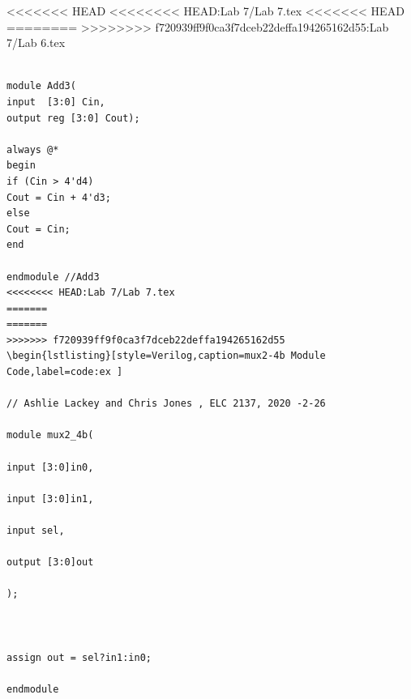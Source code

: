 \documentclass[11pt]{article}
\begin{document}
<<<<<<< HEAD
<<<<<<<< HEAD:Lab 7/Lab 7.tex
<<<<<<< HEAD
========
>>>>>>>> f720939ff9f0ca3f7dceb22deffa194265162d55:Lab 7/Lab 6.tex
\begin{lstlisting}[style=Verilog,caption=Add 3 Module Code,label=code:ex ]

module Add3(
input  [3:0] Cin,
output reg [3:0] Cout);

always @*
begin
if (Cin > 4'd4)
Cout = Cin + 4'd3;
else
Cout = Cin;
end

endmodule //Add3
<<<<<<<< HEAD:Lab 7/Lab 7.tex
=======
=======
>>>>>>> f720939ff9f0ca3f7dceb22deffa194265162d55
\begin{lstlisting}[style=Verilog,caption=mux2-4b Module Code,label=code:ex ]

// Ashlie Lackey and Chris Jones , ELC 2137, 2020 -2-26

module mux2_4b(

input [3:0]in0,

input [3:0]in1,

input sel,

output [3:0]out 

);



assign out = sel?in1:in0;

endmodule

\end{lstlisting}
\end{document}
